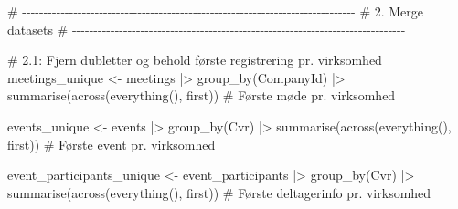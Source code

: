 \documentclass[
  11pt,
  letterpaper,
  DIV=11,
  numbers=noendperiod]{scrartcl}
\newenvironment{Shaded}{\begin{snugshade}}{\end{snugshade}}
\newcommand{\CommentTok}[1]{\textcolor[rgb]{0.37,0.37,0.37}{#1}}
\newcommand{\FunctionTok}[1]{\textcolor[rgb]{0.28,0.35,0.67}{#1}}
\newcommand{\NormalTok}[1]{\textcolor[rgb]{0.00,0.23,0.31}{#1}}
\newcommand{\OtherTok}[1]{\textcolor[rgb]{0.00,0.23,0.31}{#1}}
\newcommand{\SpecialCharTok}[1]{\textcolor[rgb]{0.37,0.37,0.37}{#1}}
\begin{document}
\begin{Shaded}
\begin{Highlighting}[]
\CommentTok{\# {-}{-}{-}{-}{-}{-}{-}{-}{-}{-}{-}{-}{-}{-}{-}{-}{-}{-}{-}{-}{-}{-}{-}{-}{-}{-}{-}{-}{-}{-}{-}{-}{-}{-}{-}{-}{-}{-}{-}{-}{-}{-}{-}{-}{-}{-}{-}{-}{-}{-}{-}{-}{-}{-}{-}{-}{-}{-}{-}{-}{-}{-}{-}{-}{-}{-}{-}{-}{-}{-}{-}{-}{-}{-}{-}{-}{-}{-}}
\CommentTok{\# 2. Merge datasets}
\CommentTok{\# {-}{-}{-}{-}{-}{-}{-}{-}{-}{-}{-}{-}{-}{-}{-}{-}{-}{-}{-}{-}{-}{-}{-}{-}{-}{-}{-}{-}{-}{-}{-}{-}{-}{-}{-}{-}{-}{-}{-}{-}{-}{-}{-}{-}{-}{-}{-}{-}{-}{-}{-}{-}{-}{-}{-}{-}{-}{-}{-}{-}{-}{-}{-}{-}{-}{-}{-}{-}{-}{-}{-}{-}{-}{-}{-}{-}{-}{-}}

\CommentTok{\# 2.1: Fjern dubletter og behold første registrering pr. virksomhed}
\NormalTok{meetings\_unique }\OtherTok{\textless{}{-}}\NormalTok{ meetings }\SpecialCharTok{|\textgreater{}}
  \FunctionTok{group\_by}\NormalTok{(CompanyId) }\SpecialCharTok{|\textgreater{}} 
  \FunctionTok{summarise}\NormalTok{(}\FunctionTok{across}\NormalTok{(}\FunctionTok{everything}\NormalTok{(), first))    }\CommentTok{\# Første møde pr. virksomhed}

\NormalTok{events\_unique }\OtherTok{\textless{}{-}}\NormalTok{ events }\SpecialCharTok{|\textgreater{}}
  \FunctionTok{group\_by}\NormalTok{(Cvr) }\SpecialCharTok{|\textgreater{}} 
  \FunctionTok{summarise}\NormalTok{(}\FunctionTok{across}\NormalTok{(}\FunctionTok{everything}\NormalTok{(), first))    }\CommentTok{\# Første event pr. virksomhed}

\NormalTok{event\_participants\_unique }\OtherTok{\textless{}{-}}\NormalTok{ event\_participants }\SpecialCharTok{|\textgreater{}}
  \FunctionTok{group\_by}\NormalTok{(Cvr) }\SpecialCharTok{|\textgreater{}} 
  \FunctionTok{summarise}\NormalTok{(}\FunctionTok{across}\NormalTok{(}\FunctionTok{everything}\NormalTok{(), first))    }\CommentTok{\# Første deltagerinfo pr. virksomhed}



\end{Highlighting}
\end{Shaded}
\end{document}
